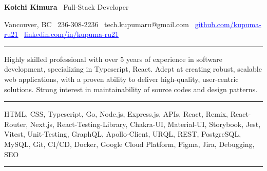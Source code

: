 \documentclass{article}
\newcommand{\link}[2]{\href{#1}{\textcolor{blue}{\uline{#2}}}}
\begin{document}
\begin{center}
    {\LARGE \textbf{Koichi Kimura} \textbar\ \LARGE Full-Stack Developer}
\end{center}
\begin{center}
    Vancouver, BC \textbar\ 236-308-2236 \textbar\ tech.kupumaru@gmail.com \textbar\
    \link{https://github.com/kupuma-ru21}{github.com/kupuma-ru21} \textbar\
    \link{https://www.linkedin.com/in/kupuma-ru21}{linkedin.com/in/kupuma-ru21}
\end{center}

\par
\vspace{-1em}
\noindent\rule{\textwidth}{0.1pt}
\noindent
Highly skilled professional with over 5 years of experience in software development, specializing in Typescript, React. Adept at creating robust, scalable web applications, with a proven ability to deliver high-quality, user-centric solutions. Strong interest in maintainability of source codes and design patterns.

\vspace{1em}

\par
\vspace{-1em}
\noindent\rule{\textwidth}{0.1pt}

\noindent
HTML, CSS, Typescript, Go, Node.js, Express.js, APIs, React, Remix, React-Router, Next.js, React-Testing-Library, Chakra-UI, Material-UI, Storybook, Jest, Vitest, Unit-Testing, GraphQL, Apollo-Client, URQL, REST, PostgreSQL, MySQL, Git, CI/CD, Docker, Google Cloud Platform, Figma, Jira, Debugging, SEO
\noindent

\vspace{1em}

\par
\vspace{-1em}
\noindent\rule{\textwidth}{0.1pt}
\vspace{0.3em}
\end{document}
